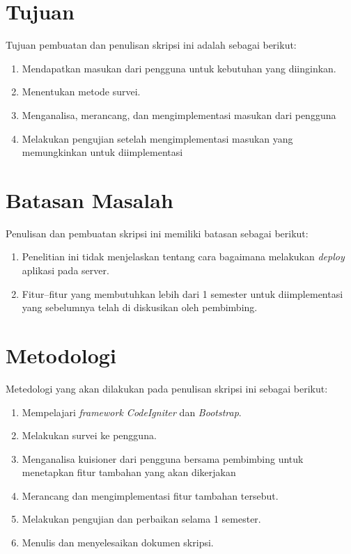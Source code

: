 \section{Tujuan}
\label{sec:tujuan}
Tujuan pembuatan dan penulisan skripsi ini adalah sebagai berikut:
\begin{enumerate}
	\item Mendapatkan masukan dari pengguna untuk kebutuhan yang diinginkan.
	\item Menentukan metode survei.
	\item Menganalisa, merancang, dan mengimplementasi masukan dari pengguna
	\item Melakukan pengujian setelah mengimplementasi masukan yang memungkinkan untuk diimplementasi

\end{enumerate}

\section{Batasan Masalah}
\label{sec:batasan}
Penulisan dan pembuatan skripsi ini memiliki batasan sebagai berikut:
\begin{enumerate}
	\item Penelitian ini tidak menjelaskan tentang cara bagaimana melakukan \textit{deploy} aplikasi pada server.
	\item Fitur--fitur yang membutuhkan lebih dari 1 semester untuk diimplementasi yang sebelumnya telah di diskusikan oleh pembimbing.
	
\end{enumerate}


\section{Metodologi}
\label{sec:metlit}
Metedologi yang akan dilakukan pada penulisan skripsi ini sebagai berikut:

\begin{enumerate}
	\item Mempelajari \textit{framework CodeIgniter} dan \textit{Bootstrap}.
	\item Melakukan survei ke pengguna.
	\item Menganalisa kuisioner dari pengguna bersama pembimbing untuk menetapkan fitur tambahan yang akan dikerjakan
	\item Merancang dan mengimplementasi fitur tambahan tersebut.
	\item Melakukan pengujian dan perbaikan selama 1 semester.
	\item Menulis dan menyelesaikan dokumen skripsi.
\end{enumerate}

